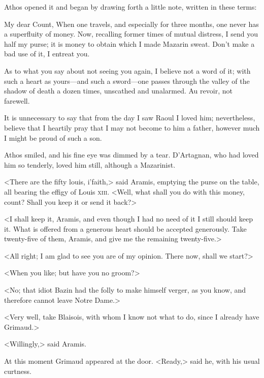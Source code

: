 Athos opened it and began by drawing forth a little note, written in these terms:

\begin{mail}{}{My dear Count,}
When one travels, and especially for three months, one never has a superfluity of money. Now, recalling former times of mutual distress, I send you half my purse; it is money to obtain which I made Mazarin sweat. Don't make a bad use of it, I entreat you.

As to what you say about not seeing you again, I believe not a word of it; with such a heart as yours—and such a sword—one passes through the valley of the shadow of death a dozen times, unscathed and unalarmed. Au revoir, not farewell.

It is unnecessary to say that from the day I saw Raoul I loved him; nevertheless, believe that I heartily pray that I may not become to him a father, however much I might be proud of such a son.



\end{mail}

Athos smiled, and his fine eye was dimmed by a tear. D'Artagnan, who had loved him so tenderly, loved him still, although a Mazarinist.

<There are the fifty louis, i'faith,> said Aramis, emptying the purse on the table, all bearing the effigy of Louis \textsc{xiii}. <Well, what shall you do with this money, count? Shall you keep it or send it back?>

<I shall keep it, Aramis, and even though I had no need of it I still should keep it. What is offered from a generous heart should be accepted generously. Take twenty-five of them, Aramis, and give me the remaining twenty-five.>

<All right; I am glad to see you are of my opinion. There now, shall we start?>

<When you like; but have you no groom?>

<No; that idiot Bazin had the folly to make himself verger, as you know, and therefore cannot leave Notre Dame.>

<Very well, take Blaisois, with whom I know not what to do, since I already have Grimaud.>

<Willingly,> said Aramis.

At this moment Grimaud appeared at the door. <Ready,> said he, with his usual curtness.

